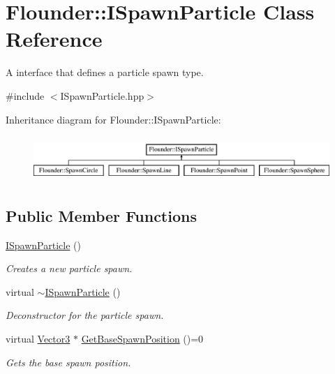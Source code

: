 \hypertarget{class_flounder_1_1_i_spawn_particle}{}\section{Flounder\+:\+:I\+Spawn\+Particle Class Reference}
\label{class_flounder_1_1_i_spawn_particle}


A interface that defines a particle spawn type.  




{\ttfamily \#include $<$I\+Spawn\+Particle.\+hpp$>$}

Inheritance diagram for Flounder\+:\+:I\+Spawn\+Particle\+:\begin{figure}[H]
\begin{center}
\leavevmode
\includegraphics[height=1.739130cm]{class_flounder_1_1_i_spawn_particle}
\end{center}
\end{figure}
\subsection*{Public Member Functions}
\begin{DoxyCompactItemize}
\item 
\hyperlink{class_flounder_1_1_i_spawn_particle_a7a4814f808ab9e046047c30563aaf28c}{I\+Spawn\+Particle} ()
\begin{DoxyCompactList}\small\item\em Creates a new particle spawn. \end{DoxyCompactList}\item 
virtual \hyperlink{class_flounder_1_1_i_spawn_particle_ae7a5d5d52fbbcd6d7b7c57a31b2f21e0}{$\sim$\+I\+Spawn\+Particle} ()
\begin{DoxyCompactList}\small\item\em Deconstructor for the particle spawn. \end{DoxyCompactList}\item 
virtual \hyperlink{class_flounder_1_1_vector3}{Vector3} $\ast$ \hyperlink{class_flounder_1_1_i_spawn_particle_ac4adda7b65431918162f52ac1f4ce57d}{Get\+Base\+Spawn\+Position} ()=0
\begin{DoxyCompactList}\small\item\em Gets the base spawn position. \end{DoxyCompactList}\end{DoxyCompactItemize}


